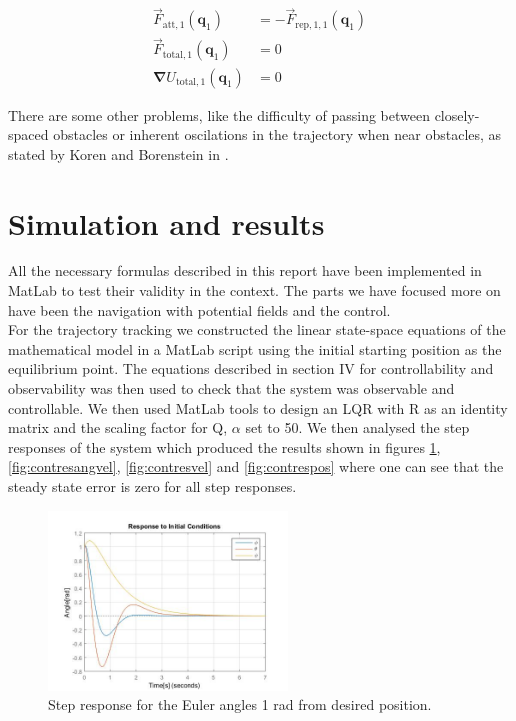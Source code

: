 \documentclass[journal]{IEEEtran}
\newcommand*{\subb}[1]{_{\mathrm{#1}}}
\begin{document}
		\begin{equation} \label{eq:cancel_example}
		\begin{split} 
					\vec{F}\subb{att,1}(\bm{q}\subb{1}) &= -\vec{F}\subb{rep,1,1}(\bm{q}\subb{1}) \\ \vec{F}\subb{total, 1}(\bm{q}\subb{1}) &= 0 \\   \bm{\nabla} U\subb{total, 1}(\bm{q}\subb{1})  &= 0
		\end{split}
		\end{equation}
		
		There are some other problems, like the difficulty of passing between closely-spaced obstacles or inherent oscilations in the trajectory when near obstacles, as stated by Koren and Borenstein in \cite{koren_pot_fields_limitations}. 
	
	\section{Simulation and results}
	All the necessary formulas described in this report have been implemented in MatLab to test their validity in the context. The parts we have focused more on have been the navigation with potential fields and the control.\\
	
	For the trajectory tracking we constructed the linear state-space equations of the mathematical model in a MatLab script using the initial starting position as the equilibrium point. The equations described in section IV for controllability and observability was then used to check that the system was observable and controllable.  We then used MatLab tools to design an LQR with R as an identity matrix and the scaling factor for Q, $\alpha$ set to 50. We then analysed the step responses of the system which produced the results shown in figures \figurename{\ref{fig:contresangles}}, \figurename{\ref{fig:contresangvel}}, \figurename{\ref{fig:contresvel}} and \figurename{\ref{fig:contrespos}} where one can see that the steady state error is zero for all step responses.\\


	
		\begin{figure}[H]
  			\centering
  			\includegraphics[width=2.5in]{Results/Controll/Fig1}
  			\caption{Step response for the Euler angles 1 rad from desired position.}
  			\label{fig:contresangles}
		\end{figure}	
		
\end{document}
